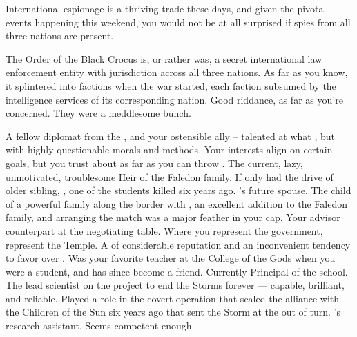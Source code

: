 \documentclass[char]{GL2020}
\begin{document}
\begin{itemz}[Notes]
	\item International espionage is a thriving trade these days, and given the pivotal events happening this weekend, you would not be at all surprised if spies from all three nations are present. 
	\item The Order of the Black Crocus is, or rather was, a secret international law enforcement entity with jurisdiction across all three nations. As far as you know, it splintered into factions when the war started, each faction subsumed by the intelligence services of its corresponding nation. Good riddance, as far as you're concerned. They were a meddlesome bunch.
\end{itemz}

\begin{contacts}
	\contact{\cEvil{}} A fellow diplomat from the \pFarm{}, and your ostensible ally -- talented at what \cEvil{\they} \cEvil{\does}, but with highly questionable morals and methods. Your interests align on certain goals, but you trust \cEvil{\them} about as far as you can throw \cEvil{\them}.
	\contact{\cHeir{}} The current, lazy, unmotivated, troublesome Heir of the Faledon family. If only \cHeir{\they} had the drive of \cHeir{\their} older sibling, \cHeirSibling{}, one of the students killed six years ago.
	\contact{\cChupStudent{}} \cHeir{}'s future spouse. The child of a powerful \pFarm{} family along the border with \pTech{}, \cChupStudent{\they} \cChupStudent{\are} an excellent addition to the Faledon family, and arranging the match was a major feather in your cap.
	\contact{\cAntiChup{}} Your advisor counterpart at the negotiating table. Where you represent the government, \cAntiChup{\they} represent\cAntiChup{\plural} the Temple. A \cAntiChup{\clergy} of considerable reputation and an inconvenient tendency to favor \cScholarship{\full} over \cHeir{}.
	\contact{\cPrincipal{}} Was your favorite teacher at the College of the Gods when you were a student, and has since become a friend. Currently Principal of the school.
	\contact{\cHeadScientist{}} The lead scientist on the project to end the Storms forever — capable, brilliant, and reliable. Played a role in the covert operation that sealed the alliance with the Children of the Sun six years ago that sent the Storm at the \pShip{} out of turn.
	\contact{\cAssistantScientist{}} \cHeadScientist{}'s research assistant. Seems competent enough.
\end{contacts}
\end{document}
